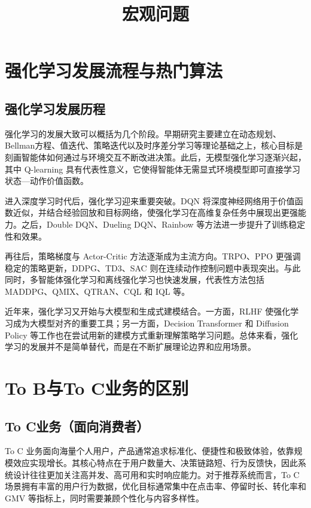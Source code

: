 \documentclass[UTF8]{ctexart}
\title{宏观问题}
\author{}
\date{}
\begin{document}
\maketitle

\section{强化学习发展流程与热门算法}

\subsection{强化学习发展历程}

强化学习的发展大致可以概括为几个阶段。早期研究主要建立在动态规划、Bellman方程、值迭代、策略迭代以及时序差分学习等理论基础之上，核心目标是刻画智能体如何通过与环境交互不断改进决策。此后，无模型强化学习逐渐兴起，其中 Q-learning 具有代表性意义，它使得智能体无需显式环境模型即可直接学习状态—动作价值函数。

进入深度学习时代后，强化学习迎来重要突破。DQN 将深度神经网络用于价值函数近似，并结合经验回放和目标网络，使强化学习在高维复杂任务中展现出更强能力。之后，Double DQN、Dueling DQN、Rainbow 等方法进一步提升了训练稳定性和效果。

再往后，策略梯度与 Actor-Critic 方法逐渐成为主流方向。TRPO、PPO 更强调稳定的策略更新，DDPG、TD3、SAC 则在连续动作控制问题中表现突出。与此同时，多智能体强化学习和离线强化学习也快速发展，代表性方法包括 MADDPG、QMIX、QTRAN、CQL 和 IQL 等。

近年来，强化学习又开始与大模型和生成式建模结合。一方面，RLHF 使强化学习成为大模型对齐的重要工具；另一方面，Decision Transformer 和 Diffusion Policy 等工作也在尝试用新的建模方式重新理解策略学习问题。总体来看，强化学习的发展并不是简单替代，而是在不断扩展理论边界和应用场景。

\section{To B与To C业务的区别}

\subsection{To C业务（面向消费者）}

To C 业务面向海量个人用户，产品通常追求标准化、便捷性和极致体验，依靠规模效应实现增长。其核心特点在于用户数量大、决策链路短、行为反馈快，因此系统设计往往更加关注高并发、高可用和实时响应能力。对于推荐系统而言，To C 场景拥有丰富的用户行为数据，优化目标通常集中在点击率、停留时长、转化率和 GMV 等指标上，同时需要兼顾个性化与内容多样性。
\end{document}
